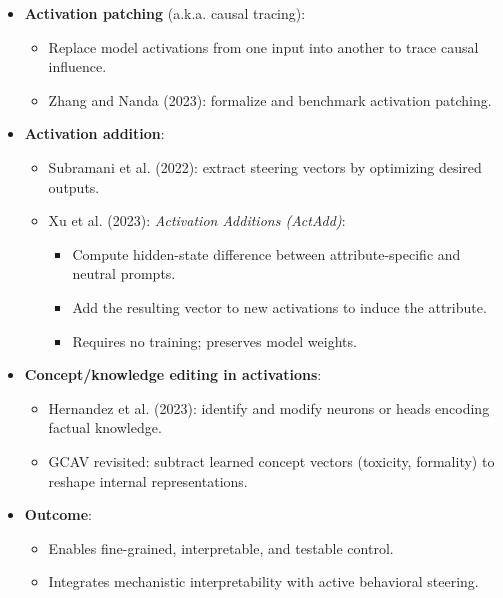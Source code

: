 \begin{itemize}
  \item \textbf{Activation patching} (a.k.a. causal tracing):
        \begin{itemize}
          \item Replace model activations from one input into another to trace causal influence.
          \item Zhang and Nanda (2023): formalize and benchmark activation patching.
        \end{itemize}
  \item \textbf{Activation addition}:
        \begin{itemize}
          \item Subramani et al. (2022): extract steering vectors by optimizing desired outputs.
          \item Xu et al. (2023): \textit{Activation Additions (ActAdd)}:
                \begin{itemize}
                  \item Compute hidden-state difference between attribute-specific and neutral prompts.
                  \item Add the resulting vector to new activations to induce the attribute.
                  \item Requires no training; preserves model weights.
                \end{itemize}
        \end{itemize}
  \item \textbf{Concept/knowledge editing in activations}:
        \begin{itemize}
          \item Hernandez et al. (2023): identify and modify neurons or heads encoding factual knowledge.
          \item GCAV revisited: subtract learned concept vectors (toxicity, formality) to reshape internal representations.
        \end{itemize}
  \item \textbf{Outcome}:
        \begin{itemize}
          \item Enables fine-grained, interpretable, and testable control.
          \item Integrates mechanistic interpretability with active behavioral steering.
        \end{itemize}
\end{itemize}

